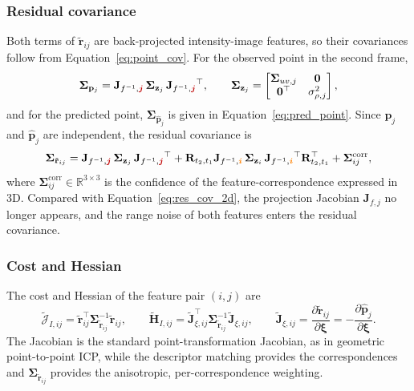\subsubsection{Residual covariance}
Both terms of $\tilde{\mathbf{r}}_{ij}$ are back-projected intensity-image features, so their covariances follow from Equation~\eqref{eq:point_cov}. For the observed point in the second frame,
\begin{equation}
    \bm{\Sigma}_{\mathbf{p}_j} = \mathbf{J}_{f^{-1},\color{red}{\bm{j}}}\,\bm{\Sigma}_{\mathbf{z}_j}\,\mathbf{J}_{f^{-1},\color{red}{\bm{j}}}^{\top}, \qquad
    \bm{\Sigma}_{\mathbf{z}_j} = \begin{bmatrix} \bm{\Sigma}_{uv,j} & \mathbf{0} \\ \mathbf{0}^{\top} & \sigma_{\rho,j}^2 \end{bmatrix},
\end{equation}
and for the predicted point, $\bm{\Sigma}_{\hat{\mathbf{p}}_j}$ is given in Equation~\eqref{eq:pred_point}. Since $\mathbf{p}_j$ and $\hat{\mathbf{p}}_j$ are independent, the residual covariance is
\begin{equation}
    \label{eq:res_cov_3d}
    \bm{\Sigma}_{\tilde{\mathbf{r}}_{ij}} = \mathbf{J}_{f^{-1},\color{red}{\bm{j}}}\,\bm{\Sigma}_{\mathbf{z}_j}\,\mathbf{J}_{f^{-1},\color{red}{\bm{j}}}^{\top} + \mathbf{R}_{t_2,t_1}\mathbf{J}_{f^{-1},\color{orange}{\bm{i}}}\,\bm{\Sigma}_{\mathbf{z}_i}\,\mathbf{J}_{f^{-1},\color{orange}{\bm{i}}}^{\top}\mathbf{R}_{t_2,t_1}^{\top} + \bm{\Sigma}_{ij}^{\mathrm{corr}},
\end{equation}
where $\bm{\Sigma}_{ij}^{\mathrm{corr}} \in \mathbb{R}^{3\times 3}$ is the confidence of the feature-correspondence expressed in 3D. Compared with Equation~\eqref{eq:res_cov_2d}, the projection Jacobian $\mathbf{J}_{f,j}$ no longer appears, and the range noise of both features enters the residual covariance.

\subsubsection{Cost and Hessian}
The cost and Hessian of the feature pair $(i,j)$ are
\begin{equation}
    \tilde{\mathcal{J}}_{I,ij} = \tilde{\mathbf{r}}_{ij}^{\top}\bm{\Sigma}_{\tilde{\mathbf{r}}_{ij}}^{-1}\tilde{\mathbf{r}}_{ij}, \qquad
    \tilde{\mathbf{H}}_{I,ij} = \tilde{\mathbf{J}}_{\xi,ij}^{\top}\bm{\Sigma}_{\tilde{\mathbf{r}}_{ij}}^{-1}\tilde{\mathbf{J}}_{\xi,ij}, \qquad
    \tilde{\mathbf{J}}_{\xi,ij} = \frac{\partial \tilde{\mathbf{r}}_{ij}}{\partial \bm{\xi}} = -\frac{\partial \hat{\mathbf{p}}_j}{\partial \bm{\xi}}.
\end{equation}
The Jacobian is the standard point-transformation Jacobian, as in geometric point-to-point ICP, while the descriptor matching provides the correspondences and $\bm{\Sigma}_{\tilde{\mathbf{r}}_{ij}}$ provides the anisotropic, per-correspondence weighting.


